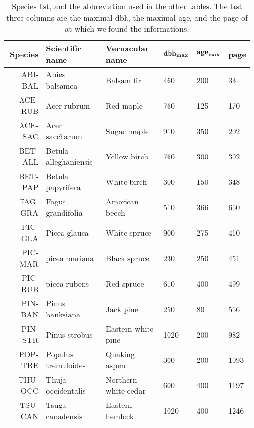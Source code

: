 \documentclass[letterpaper, 12pt]{article}
\theoremstyle{theo}
\begin{document}
\begin{refsection}
\begin{onehalfspace}
\begin{table}[h!]
\centering
\caption[Scientific and vernacular name of the 14 species]{Species list, and the abbreviation used in the other tables\label{tab::species}. The last three columns are the maximal dbh, the maximal age, and the page of \citet{Burns1990, Burns1990a} at which we found the informations.}
\label{tab::database}
\begin{tabular}{rlllll}
	\toprule
	\textbf{Species} & \textbf{Scientific name} & \textbf{Vernacular name} & $ \text{\textbf{dbh}}_{\bm{\max}} $ & $ \text{\textbf{age}}_{\bm{\max}} $ & \textbf{page} \\
	\midrule
	ABI-BAL & Abies balsamea & Balsam fir & 460 & 200 & 33 \\
	ACE-RUB & Acer rubrum & Red maple & 760 & 125 & 170 \\
	ACE-SAC & Acer saccharum & Sugar maple & 910 & 350 & 202 \\
	BET-ALL & Betula alleghaniensis & Yellow birch & 760 & 300 & 302 \\
	BET-PAP & Betula papyrifera & White birch & 300 & 150 & 348 \\
	FAG-GRA & Fagus grandifolia & American beech & 510 & 366 & 660 \\
	PIC-GLA & Picea glauca & White spruce & 900 & 275 & 410 \\
	PIC-MAR & picea mariana & Black spruce & 230 & 250 & 451 \\
	PIC-RUB & picea rubens & Red spruce & 610 & 400 & 499 \\
	PIN-BAN & Pinus banksiana & Jack pine & 250 &  80 & 566 \\
	PIN-STR & Pinus strobus & Eastern white pine & 1020 & 200 & 982 \\
	POP-TRE & Populus tremuloides & Quaking aspen & 300 & 200 & 1093 \\
	THU-OCC & Thuja occidentalis & Northern white cedar & 600 & 400 & 1197 \\
	TSU-CAN & Tsuga canadensis & Eastern hemlock & 1020 & 400 & 1246 \\
	\bottomrule
\end{tabular}
\end{table}


\end{onehalfspace}
\end{refsection}
\end{document}
